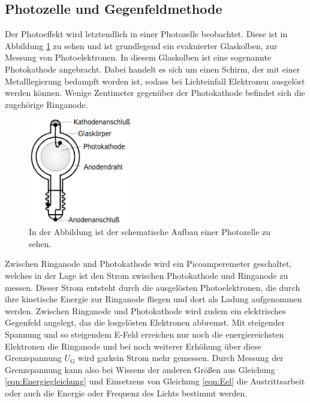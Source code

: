 \documentclass[titlepage = firstcover]{scrartcl}
\begin{document}
            \FloatBarrier

        \subsection{Photozelle und Gegenfeldmethode}
            Der Photoeffekt wird letztendlich in einer Photozelle beobachtet. Diese ist in Abbildung \ref{fig:Photozelle} zu sehen und ist grundlegend ein evakuierter Glaskolben, zur Messung von Photoelektronen. In 
            diesem Glaskolben ist eine sogenannte Photokathode angebracht. Dabei handelt es sich um einen Schirm, der mit einer Metalllegierung bedampft worden ist, sodass bei Lichteinfall Elektronen 
            ausgelöst werden können. Wenige Zentimeter gegenüber der Photokathode befindet sich die zugehörige Ringanode.

            \FloatBarrier

                \begin{figure}[h]
                  \centering
                  \includegraphics[width = 0.4\textwidth]{Bilder/Photozelle.png}
                  \caption{In der Abbildung ist der schematische Aufbau einer Photozelle zu sehen.}
                  \label{fig:Photozelle}
                \end{figure}

            \FloatBarrier

            \noindent
            Zwischen Ringanode und Photokathode wird ein Picoamperemeter geschaltet, welches in der Lage ist den Strom zwischen Photokathode und Ringanode zu messen. Dieser Strom entsteht durch die
            ausgelösten Photoelektronen, die durch ihre kinetische Energie zur Ringanode fliegen und dort als Ladung aufgenommen werden. Zwischen Ringanode und Photokathode wird zudem ein elektrisches
            Gegenfeld angelegt, das die losgelösten Elektronen abbremst. Mit steigender Spannung und so steigendem E-Feld erreichen nur noch die energiereichsten Elektronen die Ringanode und bei noch 
            weiterer Erhöhung über diese Grenzspannung $U_{\text{G}}$ wird garkein Strom mehr gemessen. Durch Messung der Grenzspannung kann also bei Wissens der anderen Größen aus Gleichung 
            \ref{eqn:Energiegleichung} und Einsetzens von Gleichung \ref{eqn:Eel} die Austrittsarbeit oder auch die Energie oder Frequenz des Lichts bestimmt werden.
\end{document}
